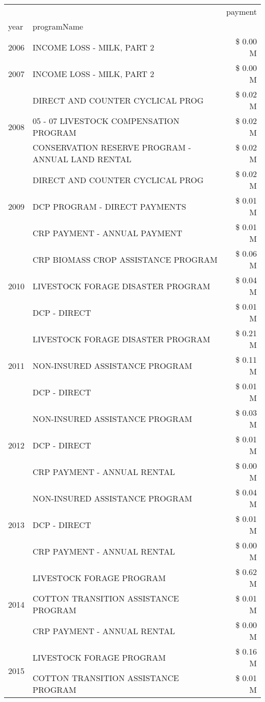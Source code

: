\begin{tabular}{llr}
\toprule
 &  & payment \\
year & programName &  \\
\midrule
2006 & INCOME LOSS - MILK, PART 2 & \$ 0.00 M \\
\cline{1-3}
2007 & INCOME LOSS - MILK, PART 2 & \$ 0.00 M \\
\cline{1-3}
\multirow[t]{3}{*}{2008} & DIRECT AND COUNTER CYCLICAL PROG & \$ 0.02 M \\
 & 05 - 07 LIVESTOCK COMPENSATION PROGRAM & \$ 0.02 M \\
 & CONSERVATION RESERVE PROGRAM - ANNUAL LAND RENTAL & \$ 0.02 M \\
\cline{1-3}
\multirow[t]{3}{*}{2009} & DIRECT AND COUNTER CYCLICAL PROG & \$ 0.02 M \\
 & DCP PROGRAM - DIRECT PAYMENTS & \$ 0.01 M \\
 & CRP PAYMENT - ANNUAL PAYMENT & \$ 0.01 M \\
\cline{1-3}
\multirow[t]{3}{*}{2010} & CRP BIOMASS CROP ASSISTANCE PROGRAM & \$ 0.06 M \\
 & LIVESTOCK FORAGE DISASTER PROGRAM & \$ 0.04 M \\
 & DCP - DIRECT & \$ 0.01 M \\
\cline{1-3}
\multirow[t]{3}{*}{2011} & LIVESTOCK FORAGE DISASTER PROGRAM & \$ 0.21 M \\
 & NON-INSURED ASSISTANCE PROGRAM & \$ 0.11 M \\
 & DCP - DIRECT & \$ 0.01 M \\
\cline{1-3}
\multirow[t]{3}{*}{2012} & NON-INSURED ASSISTANCE PROGRAM & \$ 0.03 M \\
 & DCP - DIRECT & \$ 0.01 M \\
 & CRP PAYMENT - ANNUAL RENTAL & \$ 0.00 M \\
\cline{1-3}
\multirow[t]{3}{*}{2013} & NON-INSURED ASSISTANCE PROGRAM & \$ 0.04 M \\
 & DCP - DIRECT & \$ 0.01 M \\
 & CRP PAYMENT - ANNUAL RENTAL & \$ 0.00 M \\
\cline{1-3}
\multirow[t]{3}{*}{2014} & LIVESTOCK FORAGE PROGRAM & \$ 0.62 M \\
 & COTTON TRANSITION ASSISTANCE PROGRAM & \$ 0.01 M \\
 & CRP PAYMENT - ANNUAL RENTAL & \$ 0.00 M \\
\cline{1-3}
\multirow[t]{3}{*}{2015} & LIVESTOCK FORAGE PROGRAM & \$ 0.16 M \\
 & COTTON TRANSITION ASSISTANCE PROGRAM & \$ 0.01 M \\

\end{tabular}
